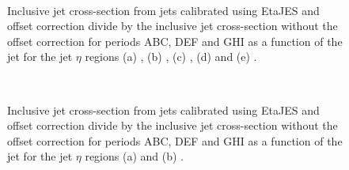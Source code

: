 \begin{figure}
\centering
\mbox{
              \quad
              \quad
}
\mbox{
              \quad
              \quad
}
\mbox{
              \quad
}


\caption[]{
Inclusive jet cross-section from jets calibrated using EtaJES and offset correction divide by the inclusive jet cross-section without the offset correction for periods ABC, DEF and GHI as a function of the jet \pt{} for the jet $\eta$ regions (a) , (b) , (c) , (d)  and  (e) .
\label{JetPerf:Offset_Nominal_Central}}
\end{figure}


\begin{figure}
\centering

\mbox{
              \quad
              \quad
}
\caption[]{
Inclusive jet cross-section from jets calibrated using EtaJES and offset correction divide by the inclusive jet cross-section without the offset correction for periods ABC, DEF and GHI as a function of the jet \pt{} for the jet $\eta$ regions (a)  and (b) .
\label{JetPerf:Offset_Nominal_Forward}}
\end{figure}



